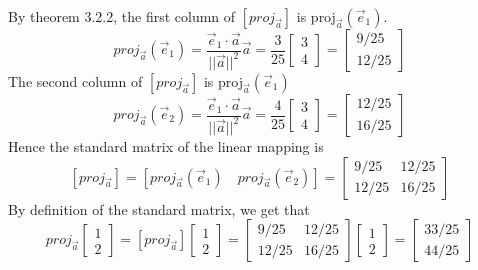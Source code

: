 \documentclass[10pt,letter]{article}
\begin{document}
By theorem 3.2.2, the first column of $[proj_{\vec{a}}]$ is proj$_{\vec{a}}(\vec{e}_1)$. $$proj_{\vec{a}}(\vec{e}_1)=\frac{\vec{e}_1\cdot\vec{a}}{||\vec{a}||^2}\vec{a} = \frac{3}{25}\begin{bmatrix}3\\4\end{bmatrix} = \begin{bmatrix}9/25\\12/25\end{bmatrix}$$ The second column of $[proj_{\vec{a}}]$ is proj$_{\vec{a}}(\vec{e}_1)$ $$proj_{\vec{a}}(\vec{e}_2)=\frac{\vec{e}_1\cdot\vec{a}}{||\vec{a}||^2}\vec{a} = \frac{4}{25}\begin{bmatrix}3\\4\end{bmatrix} = \begin{bmatrix}12/25\\16/25\end{bmatrix}$$ Hence the standard matrix of the linear mapping is $$[proj_{\vec{a}}] = [proj_{\vec{a}}(\vec{e}_1)\quad proj_{\vec{a}}(\vec{e}_2)] = \begin{bmatrix}9/25&12/25\\12/25&16/25\end{bmatrix}$$ By definition of the standard matrix, we get that $$proj_{\vec{a}}\begin{bmatrix}1\\2\end{bmatrix}=[proj_{\vec{a}}]\begin{bmatrix}1\\2\end{bmatrix} = \begin{bmatrix}9/25&12/25\\12/25&16/25\end{bmatrix}\begin{bmatrix}1\\2\end{bmatrix} = \begin{bmatrix}33/25\\44/25\end{bmatrix}$$
\end{document}
